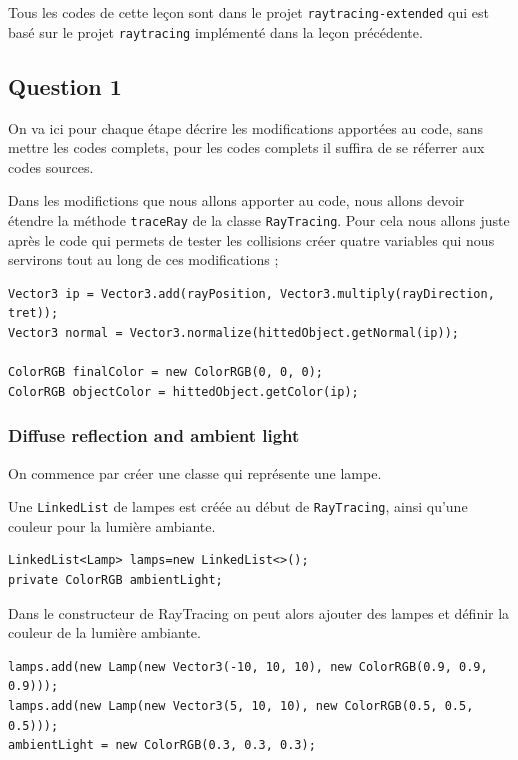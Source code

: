 Tous les codes de cette leçon sont dans le projet \texttt{raytracing-extended} qui est basé sur le projet \texttt{raytracing} implémenté dans la leçon précédente.

\subsection{Question 1}

On va ici pour chaque étape décrire les modifications apportées au code, sans mettre les codes complets, pour les codes complets il suffira de se réferrer aux codes sources.

Dans les modifictions que nous allons apporter au code, nous allons devoir étendre la méthode \texttt{traceRay} de la classe \texttt{RayTracing}. Pour cela nous allons juste après le code qui permets de tester les collisions créer quatre variables qui nous servirons tout au long de ces modifications ;

\begin{lstlisting}
Vector3 ip = Vector3.add(rayPosition, Vector3.multiply(rayDirection, tret));
Vector3 normal = Vector3.normalize(hittedObject.getNormal(ip));
        
ColorRGB finalColor = new ColorRGB(0, 0, 0);
ColorRGB objectColor = hittedObject.getColor(ip);
\end{lstlisting}

\subsubsection{Diffuse reflection and ambient light}

On commence par créer une classe qui représente une lampe.


Une \texttt{LinkedList} de lampes est créée au début de \texttt{RayTracing}, ainsi qu'une couleur pour la lumière ambiante.

\begin{lstlisting}
LinkedList<Lamp> lamps=new LinkedList<>();
private ColorRGB ambientLight;
\end{lstlisting}

Dans le constructeur de RayTracing on peut alors ajouter des lampes et définir la couleur de la lumière ambiante.

\begin{lstlisting}
lamps.add(new Lamp(new Vector3(-10, 10, 10), new ColorRGB(0.9, 0.9, 0.9)));
lamps.add(new Lamp(new Vector3(5, 10, 10), new ColorRGB(0.5, 0.5, 0.5)));
ambientLight = new ColorRGB(0.3, 0.3, 0.3);
\end{lstlisting}

